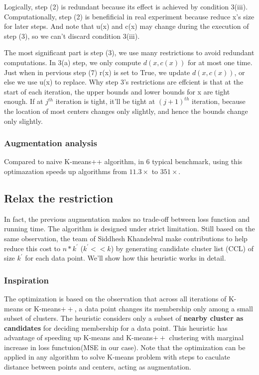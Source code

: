 \documentclass[11pt]{article}
\begin{document}
Logically, step (2) is redundant because its effect is achieved by condition 3(iii). Computationally, step (2) is benefificial in real experiment because reduce x's size for later steps. And note that u(x) and c(x) may change during the execution of step (3), so we can't discard condition 3(iii).\par
The most significant part is step (3), we use many restrictions to avoid redundant computations. In 3(a) step, we only compute $d(x,c(x))$ for at most one time. Just when in pervious step (7) r(x) is set to True, we update  $d(x,c(x))$, or else we use u(x) to replace. Why step 3's restrictions are effcient is that at the start of each iteration, the upper bounds and lower bounds for x are tight enough. If at $j^{th}$ iteration is tight, it'll be tight at $(j+1)^{th}$ iteration, because the location of most centers changes only slightly, and hence the bounds change only slightly. \par

\subsubsection{Augmentation analysis}
Compared to naive K-means++ algorithm, in 6 typical benchmark, using this optimazation speeds up algorithms from $ 11.3 \times$ to $  351 \times$.

\subsection{Relax the restriction}
In fact, the previous augmentation makes no trade-off between loss function and running time. The algorithm is designed under strict limitation. Still based on the same observation, the team of Siddhesh Khandelwal\cite{Faster} make contributions to help reduce this cost to $n * k^{\prime}$ ($k^{\prime} << k$) by generating candidate cluster list (CCL) of size $k^{\prime}$ for each data point. We'll show how this heuristic works in detail.
\subsubsection{Inspiration}
The optimization is based on the observation that across all iterations of K-means or K-means$++$, a data point changes its membership only among a small subset of clusters. The heuristic considers only a subset of \textbf{nearby cluster as candidates} for deciding membership for a data point. This heuristic has advantage of speeding up K-means and K-means$++$ clustering with marginal increase in loss functuion(MSE in our case). Note that the optimization can be applied in any algorithm to solve K-means problem with steps to caculate distance between points and centers, acting as augmentation.
\end{document}
